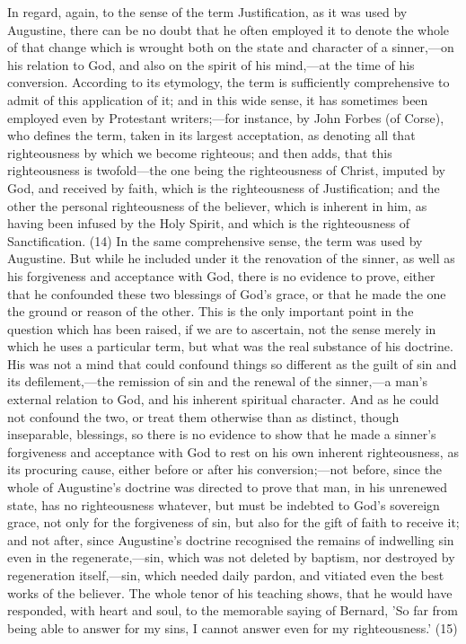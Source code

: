 \documentclass[
]{book}
\begin{document}
In regard, again, to the sense of the term Justification, as it was used by Augustine, there can be no doubt that he often employed it to denote the whole of that change which is wrought both on the state and character of a sinner,---on his relation to God, and also on the spirit of his mind,---at the time of his conversion. According to its etymology, the term is sufficiently comprehensive to admit of this application of it; and in this wide sense, it has sometimes been employed even by Protestant writers;---for instance, by John Forbes (of Corse), who defines the term, taken in its largest acceptation, as denoting all that righteousness by which we become righteous; and then adds, that this righteousness is twofold---the one being the righteousness of Christ, imputed by God, and received by faith, which is the righteousness of Justification; and the other the personal righteousness of the believer, which is inherent in him, as having been infused by the Holy Spirit, and which is the righteousness of Sanctification. (14) In the same comprehensive sense, the term was used by Augustine. But while he included under it the renovation of the sinner, as well as his forgiveness and acceptance with God, there is no evidence to prove, either that he confounded these two blessings of God's grace, or that he made the one the ground or reason of the other. This is the only important point in the question which has been raised, if we are to ascertain, not the sense merely in which he uses a particular term, but what was the real substance of his doctrine. His was not a mind that could confound things so different as the guilt of sin and its defilement,---the remission of sin and the renewal of the sinner,---a man's external relation to God, and his inherent spiritual character. And as he could not confound the two, or treat them otherwise than as distinct, though inseparable, blessings, so there is no evidence to show that he made a sinner's forgiveness and acceptance with God to rest on his own inherent righteousness, as its procuring cause, either before or after his conversion;---not before, since the whole of Augustine's doctrine was directed to prove that man, in his unrenewed state, has no righteousness whatever, but must be indebted to God's sovereign grace, not only for the forgiveness of sin, but also for the gift of faith to receive it; and not after, since Augustine's doctrine recognised the remains of indwelling sin even in the regenerate,---sin, which was not deleted by baptism, nor destroyed by regeneration itself,---sin, which needed daily pardon, and vitiated even the best works of the believer. The whole tenor of his teaching shows, that he would have responded, with heart and soul, to the memorable saying of Bernard, 'So far from being able to answer for my sins, I cannot answer even for my righteousness.' (15)
\end{document}
